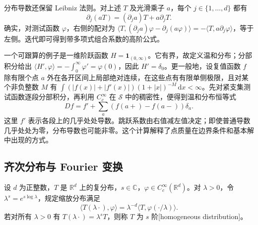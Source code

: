 分布导数还保留 Leibniz 法则。对上述 \(T\) 及光滑乘子 \(a\)，每个 \(j\in\{1,\ldots,d\}\) 都有
\[
 \partial_j(aT)=(\partial_ja)T+a\partial_jT.
\]
确实，对测试函数 \(\varphi\)，右侧的配对为 \(\langle T,(\partial_ja)\varphi-\partial_j(a\varphi)\rangle=-\langle T,a\partial_j\varphi\rangle\)，等于左侧。迭代即可得到带多项式组合系数的高阶公式。

\ProseParagraphBreak

一个可跟算的例子是一维阶跃函数 \(H=\mathbf1_{(0,\infty)}\)。它有界，故定义温和分布；分部积分给出 \(\langle H',\varphi\rangle=-\int_0^\infty\varphi'=\varphi(0)\)，因此 \(H'=\delta_0\)。更一般地，设复值函数 \(f\) 除有限个点 \(a\) 外在各开区间上局部绝对连续，在这些点有有限单侧极限，且对某个非负整数 \(M\) 有 \(\int(|f(x)|+|f'(x)|)(1+|x|)^{-M}\,\mathrm{d}x<\infty\)。先对紧支集测试函数逐段分部积分，再利用 \(C_c^\infty\) 在 \(\mathcal S\) 中的稠密性，便得到温和分布恒等式
\[
 Df=f'+\sum_a(f(a+)-f(a-))\delta_a.
\]
这里 \(f'\) 表示各段上的几乎处处导数。跳跃系数由右值减左值决定；即使普通导数几乎处处为零，分布导数也可能非零。这个计算解释了点质量在边界条件和基本解中出现的方式。

\subsection{齐次分布与 Fourier 变换}
\label{b2:subsec:050305}

\begin{definition}\label{b2:def:05-homogeneous}
设 \(d\) 为正整数，\(T\) 是 \(\mathbb R^d\) 上的复分布，\(s\in\mathbb C\)，\(\varphi\in C_c^\infty(\mathbb R^d)\)。对 \(\lambda>0\)，令 \(\lambda^s=e^{s\log\lambda}\)，规定缩放分布满足
\[
 \langle T(\lambda\cdot),\varphi\rangle
 =\lambda^{-d}\langle T,\varphi(\cdot/\lambda)\rangle.
\]
若对所有 \(\lambda>0\) 有 \(T(\lambda\cdot)=\lambda^sT\)，则称 \(T\) 为 \(s\) 阶[homogeneous distribution]。
\end{definition}

